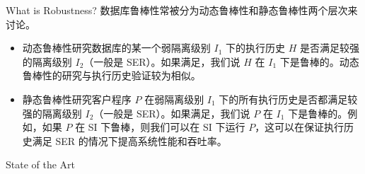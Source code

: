 
\begin{frame}{What is Robustness?}
	数据库鲁棒性常被分为动态鲁棒性和静态鲁棒性两个层次来讨论。

	\begin{itemize}
		\item 动态鲁棒性研究数据库的某一个弱隔离级别 $I_1$ 下的执行历史 $H$ 是否满足较强的隔离级别 $I_2$（一般是 SER）。如果满足，我们说 $H$ 在 $I_1$ 下是鲁棒的。动态鲁棒性的研究与执行历史验证较为相似。
		\item 静态鲁棒性研究客户程序 $P$ 在弱隔离级别 $I_1$ 下的所有执行历史是否都满足较强的隔离级别 $I_2$（一般是 SER）。如果满足，我们说 $P$ 在 $I_1$ 下是鲁棒的。例如，如果 $P$ 在 SI 下鲁棒，则我们可以在 SI 下运行 $P$，这可以在保证执行历史满足 SER 的情况下提高系统性能和吞吐率。
	\end{itemize}
\end{frame}

\begin{frame}{State of the Art}
	
\end{frame}


